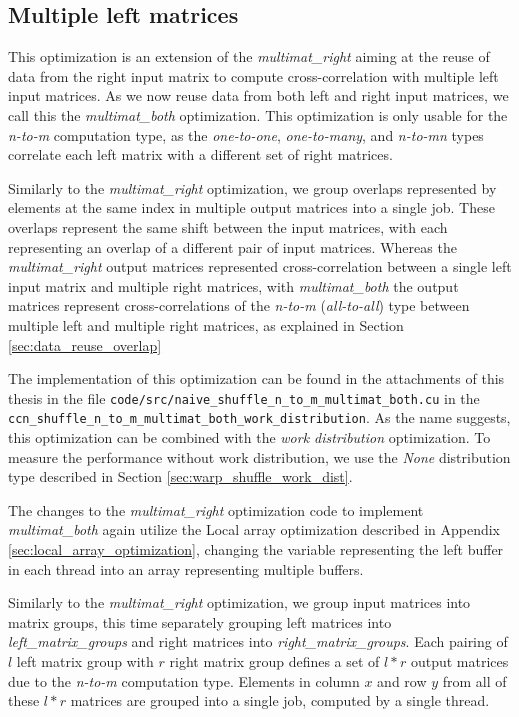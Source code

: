 
\subsection{Multiple left matrices}
\label{sec:multimat_both}

This optimization is an extension of the \textit{multimat\_right} aiming at the reuse of data from the right input matrix to compute cross-correlation with multiple left input matrices. As we now reuse data from both left and right input matrices, we call this the \textit{multimat\_both} optimization. This optimization is only usable for the \textit{n-to-m} computation type, as the \textit{one-to-one}, \textit{one-to-many}, and \textit{n-to-mn} types correlate each left matrix with a different set of right matrices.

Similarly to the \textit{multimat\_right} optimization, we group overlaps represented by elements at the same index in multiple output matrices into a single job. These overlaps represent the same shift between the input matrices, with each representing an overlap of a different pair of input matrices. Whereas the \textit{multimat\_right} output matrices represented cross-correlation between a single left input matrix and multiple right matrices, with \textit{multimat\_both} the output matrices represent cross-correlations of the \textit{n-to-m} (\textit{all-to-all}) type between multiple left and multiple right matrices, as explained in Section \ref{sec:data_reuse_overlap}

The implementation of this optimization can be found in the attachments of this thesis in the file \texttt{code/src/naive\_shuffle\_n\_to\_m\_multimat\_both.cu} in the \texttt{ccn\_shuffle\_n\_to\_m\_multimat\_both\_work\_distribution}. As the name suggests, this optimization can be combined with the \textit{work distribution} optimization. To measure the performance without work distribution, we use the \textit{None} distribution type described in Section \ref{sec:warp_shuffle_work_dist}.


The changes to the \textit{multimat\_right} optimization code to implement \textit{multimat\_both} again utilize the Local array optimization described in Appendix \ref{sec:local_array_optimization}, changing the variable representing the left buffer in each thread into an array representing multiple buffers. 


Similarly to the \textit{multimat\_right} optimization, we group input matrices into matrix groups, this time separately grouping left matrices into \textit{left\_matrix\_groups} and right matrices into \textit{right\_matrix\_groups}. Each pairing of $l$ left matrix group with $r$ right matrix group defines a set of $l*r$ output matrices due to the \textit{n-to-m} computation type. Elements in column $x$ and row $y$ from all of these $l*r$ matrices are grouped into a single job, computed by a single thread. 

